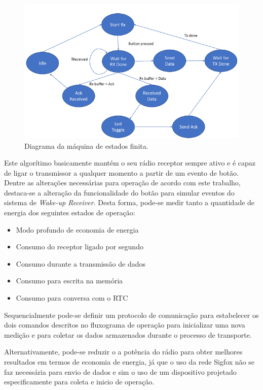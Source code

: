 \begin{figure}
  \caption{Diagrama da máquina de estados finita.}
  \begin{center}
      \includegraphics[scale=0.8]{img/p2p_fsm.PNG}
  \end{center}
  \label{fig:p2p}
\end{figure}

Este algorítimo basicamente mantém o seu rádio receptor sempre ativo e é capaz de ligar o transmissor a qualquer momento a partir de um evento de botão. Dentre as alterações necessárias para operação de acordo com este trabalho, destaca-se a alteração da funcionalidade do botão para simular eventos do sistema de \textit{Wake-up Receiver}. Desta forma, pode-se medir tanto a quantidade de energia dos seguintes estados de operação:
\begin{itemize}
    \item Modo profundo de economia de energia
    \item Consumo do receptor ligado por segundo
    \item Consumo durante a transmissão de dados
    \item Consumo para escrita na memória
    \item Consumo para conversa com o RTC
\end{itemize}

Sequencialmente pode-se definir um protocolo de comunicação para estabelecer os dois comandos descritos no fluxograma de operação para inicializar uma nova medição e para coletar os dados armazenados durante o processo de transporte.

Alternativamente, pode-se reduzir o a potência do rádio para obter melhores resultados em termos de economia de energia, já que o uso da rede Sigfox não se faz necessária para envio de dados e sim o uso de um dispositivo projetado especificamente para coleta e inicio de operação.

